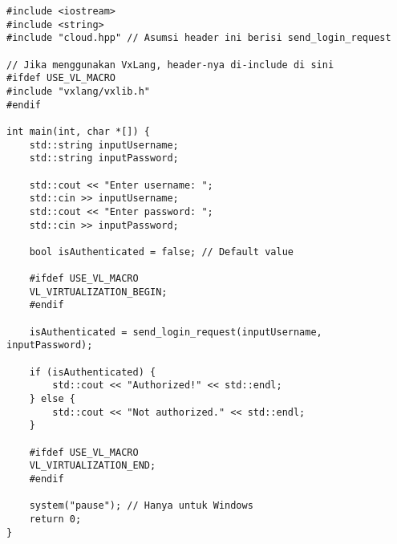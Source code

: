 \begin{verbatim}
#include <iostream>
#include <string>
#include "cloud.hpp" // Asumsi header ini berisi send_login_request

// Jika menggunakan VxLang, header-nya di-include di sini
#ifdef USE_VL_MACRO
#include "vxlang/vxlib.h"
#endif

int main(int, char *[]) {
    std::string inputUsername;
    std::string inputPassword;

    std::cout << "Enter username: ";
    std::cin >> inputUsername;
    std::cout << "Enter password: ";
    std::cin >> inputPassword;

    bool isAuthenticated = false; // Default value

    #ifdef USE_VL_MACRO
    VL_VIRTUALIZATION_BEGIN;
    #endif

    isAuthenticated = send_login_request(inputUsername, inputPassword);

    if (isAuthenticated) {
        std::cout << "Authorized!" << std::endl;
    } else {
        std::cout << "Not authorized." << std::endl;
    }

    #ifdef USE_VL_MACRO
    VL_VIRTUALIZATION_END;
    #endif

    system("pause"); // Hanya untuk Windows
    return 0;
}
    \end{verbatim}
\label{lst:console_cloud_full}




